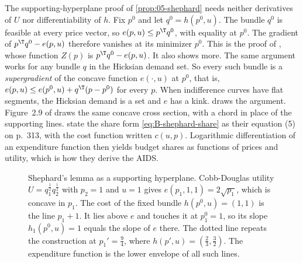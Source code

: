 The supporting-hyperplane proof of \cref{prop:05-shephard} needs neither derivatives of $U$ nor
differentiability of $h$. Fix $p^0$ and let $q^0 = h(p^0, u)$. The bundle $q^0$ is feasible at every price
vector, so $e(p, u) \leq p^\T q^0$, with equality at $p^0$. The gradient of $p^\T q^0 - e(p, u)$ therefore
vanishes at its minimizer $p^0$. This is the proof of \citet[eqs.~3.10--3.11, p.~40]{DeatonMuellbauer1980b},
whose function $Z(p)$ is $p^\T q^0 - e(p, u)$. It also shows more. The same argument works for any bundle $q$ in
the Hicksian demand set. So every such bundle is a \emph{supergradient}
of the concave function $e(\cdot, u)$ at $p^0$, that is, $e(p, u) \leq e(p^0, u) + q^\T(p - p^0)$ for every $p$. When indifference curves have flat segments, the Hicksian
demand is a set and $e$ has a kink.  draws the argument. Figure~2.9 of
\citet[p.~39]{DeatonMuellbauer1980b} draws the same concave cross section, with a chord in place of the
supporting lines. \citet{DeatonMuellbauer1980a}
state the share form \eqref{eq:B-shephard-share} as their equation (5) on p.~313, with the cost function
written $c(u, p)$. Logarithmic differentiation of an expenditure function then yields budget shares as
functions of prices and utility, which is how they derive the AIDS.

\begin{figure}[htbp]
\centering
{}
\caption{Shephard's lemma as a supporting hyperplane. Cobb-Douglas utility
$U = q_1^{\frac{1}{2}}q_2^{\frac{1}{2}}$ with $p_2 = 1$ and $u = 1$ gives $e(p_1, 1, 1) = 2\sqrt{p_1}$, which is
concave in $p_1$. The cost of the fixed bundle $h(p^0, u) = (1, 1)$ is the line $p_1 + 1$. It lies above
$e$ and touches it at $p_1^0 = 1$, so its slope $h_1(p^0, u) = 1$ equals the slope of $e$ there. The dotted
line repeats the construction at $p_1' = \frac{9}{4}$, where $h(p', u) = (\frac{2}{3}, \frac{3}{2})$. The
expenditure function is the lower envelope of all such lines.}\label{fig:B-expfn}
\end{figure}

